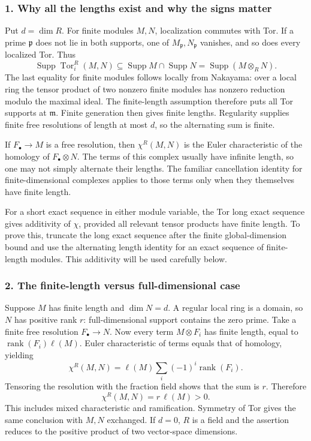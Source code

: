 \documentclass[11pt]{article}
\begin{document}
\subsubsection{1. Why all the lengths exist and why the signs matter}
Put $d=\dim R$. For finite modules $M,N$, localization commutes with Tor. If a prime $\mathfrak p$ does not lie in both supports, one of $M_\mathfrak p,N_\mathfrak p$ vanishes, and so does every localized Tor. Thus
\[
 \operatorname{Supp}\operatorname{Tor}_i^R(M,N)
 \subseteq\operatorname{Supp}M\cap\operatorname{Supp}N
 =\operatorname{Supp}(M\otimes_RN).
\]
The last equality for finite modules follows locally from Nakayama: over a local ring the tensor product of two nonzero finite modules has nonzero reduction modulo the maximal ideal. The finite-length assumption therefore puts all Tor supports at $\mathfrak m$. Finite generation then gives finite lengths. Regularity supplies finite free resolutions of length at most $d$, so the alternating sum is finite.

If $F_\bullet\to M$ is a free resolution, then $\chi^R(M,N)$ is the Euler characteristic of the homology of $F_\bullet\otimes N$. The terms of this complex usually have infinite length, so one may not simply alternate their lengths. The familiar cancellation identity for finite-dimensional complexes applies to those terms only when they themselves have finite length.

For a short exact sequence in either module variable, the Tor long exact sequence gives additivity of $\chi$, provided all relevant tensor products have finite length. To prove this, truncate the long exact sequence after the finite global-dimension bound and use the alternating length identity for an exact sequence of finite-length modules. This additivity will be used carefully below.

\subsubsection{2. The finite-length versus full-dimensional case}
Suppose $M$ has finite length and $\dim N=d$. A regular local ring is a domain, so $N$ has positive rank $r$: full-dimensional support contains the zero prime. Take a finite free resolution $F_\bullet\to N$. Now every term $M\otimes F_i$ has finite length, equal to $\operatorname{rank}(F_i)\ell(M)$. Euler characteristic of terms equals that of homology, yielding
\[
 \chi^R(M,N)=\ell(M)\sum_i(-1)^i\operatorname{rank}(F_i).
\]
Tensoring the resolution with the fraction field shows that the sum is $r$. Therefore
\[
 \chi^R(M,N)=r\,\ell(M)>0.                             \tag{1}
\]
This includes mixed characteristic and ramification. Symmetry of Tor gives the same conclusion with $M,N$ exchanged. If $d=0$, $R$ is a field and the assertion reduces to the positive product of two vector-space dimensions.
\end{document}
